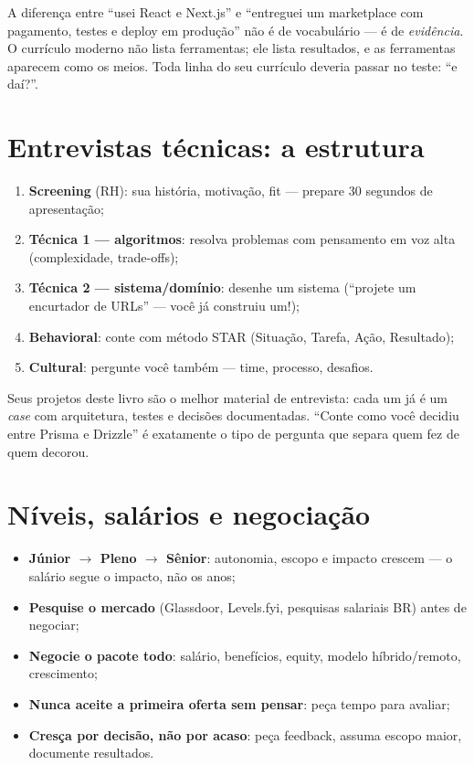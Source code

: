 \begin{caixaconceito}
A diferença entre ``usei React e Next.js'' e ``entreguei um marketplace com
pagamento, testes e deploy em produção'' não é de vocabulário — é de
\emph{evidência}. O currículo moderno não lista ferramentas; ele lista
resultados, e as ferramentas aparecem como os meios. Toda linha do seu
currículo deveria passar no teste: ``e daí?''.
\end{caixaconceito}

\section{Entrevistas técnicas: a estrutura}

\begin{enumerate}[leftmargin=*, itemsep=0.4em]
  \item \textbf{Screening} (RH): sua história, motivação, fit — prepare 30 segundos de apresentação;
  \item \textbf{Técnica 1 — algoritmos}: resolva problemas com pensamento em voz alta (complexidade, trade-offs);
  \item \textbf{Técnica 2 — sistema/domínio}: desenhe um sistema (``projete um encurtador de URLs'' — você já construiu um!);
  \item \textbf{Behavioral}: conte com método STAR (Situação, Tarefa, Ação, Resultado);
  \item \textbf{Cultural}: pergunte você também — time, processo, desafios.
\end{enumerate}

\begin{caixadica}
Seus projetos deste livro são o melhor material de entrevista: cada um já é um
\emph{case} com arquitetura, testes e decisões documentadas. ``Conte como você
decidiu entre Prisma e Drizzle'' é exatamente o tipo de pergunta que separa
quem fez de quem decorou.
\end{caixadica}

\section{Níveis, salários e negociação}

\begin{itemize}[leftmargin=*, itemsep=0.4em]
  \item \textbf{Júnior $\rightarrow$ Pleno $\rightarrow$ Sênior}: autonomia, escopo e impacto crescem — o salário segue o impacto, não os anos;
  \item \textbf{Pesquise o mercado} (Glassdoor, Levels.fyi, pesquisas salariais BR) antes de negociar;
  \item \textbf{Negocie o pacote todo}: salário, benefícios, equity, modelo híbrido/remoto, crescimento;
  \item \textbf{Nunca aceite a primeira oferta sem pensar}: peça tempo para avaliar;
  \item \textbf{Cresça por decisão, não por acaso}: peça feedback, assuma escopo maior, documente resultados.
\end{itemize}

